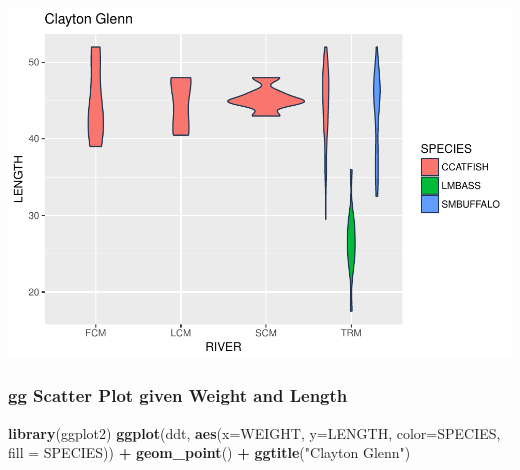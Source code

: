 \documentclass[]{article}
\newenvironment{Shaded}{\begin{snugshade}}{\end{snugshade}}
\newcommand{\KeywordTok}[1]{\textcolor[rgb]{0.13,0.29,0.53}{\textbf{#1}}}
\newcommand{\DataTypeTok}[1]{\textcolor[rgb]{0.13,0.29,0.53}{#1}}
\newcommand{\StringTok}[1]{\textcolor[rgb]{0.31,0.60,0.02}{#1}}
\newcommand{\OperatorTok}[1]{\textcolor[rgb]{0.81,0.36,0.00}{\textbf{#1}}}
\newcommand{\NormalTok}[1]{#1}
\begin{document}
\begin{Shaded}
\end{Shaded}

\includegraphics{./tex2pdf.5760/fcb1535ef1cfdeffe2df938e902f2ba114d06004.pdf}

\subsubsection{gg Scatter Plot given Weight and
Length}\label{gg-scatter-plot-given-weight-and-length}

\begin{Shaded}
\begin{Highlighting}[]
\KeywordTok{library}\NormalTok{(ggplot2)}
\KeywordTok{ggplot}\NormalTok{(ddt, }\KeywordTok{aes}\NormalTok{(}\DataTypeTok{x=}\NormalTok{WEIGHT, }\DataTypeTok{y=}\NormalTok{LENGTH, }\DataTypeTok{color=}\NormalTok{SPECIES, }\DataTypeTok{fill =}\NormalTok{ SPECIES)) }\OperatorTok{+}\StringTok{ }\KeywordTok{geom_point}\NormalTok{() }\OperatorTok{+}\StringTok{ }\KeywordTok{ggtitle}\NormalTok{(}\StringTok{"Clayton Glenn"}\NormalTok{)}
\end{Highlighting}
\end{Shaded}
\end{document}
